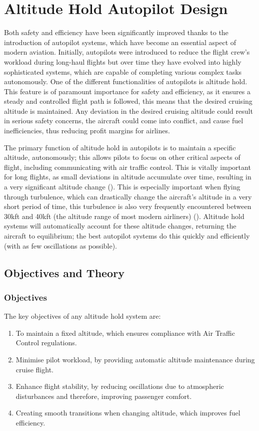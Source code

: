 \documentclass[stu, a4paper, 12pt, floatsintext]{apa7}
\numberwithin{figure}{section}
\numberwithin{table}{section}
\numberwithin{equation}{section}
\begin{document}
\section{Altitude Hold Autopilot Design}
Both safety and efficiency have been significantly improved thanks to the introduction of autopilot systems, which have become an essential aspect of modern aviation. Initially, autopilots were introduced to reduce the flight crew’s workload during long-haul flights but over time they have evolved into highly sophisticated systems, which are capable of completing various complex tasks autonomously. One of the different functionalities of autopilots is altitude hold. This feature is of paramount importance for safety and efficiency, as it ensures a steady and controlled flight path is followed, this means that the desired cruising altitude is maintained. Any deviation in the desired cruising altitude could result in serious safety concerns, the aircraft could come into conflict, and cause fuel inefficiencies, thus reducing profit margins for airlines. \newline

The primary function of altitude hold in autopilots is to maintain a specific altitude, autonomously; this allows pilots to focus on other critical aspects of flight, including communicating with air traffic control. This is vitally important for long flights, as small deviations in altitude accumulate over time, resulting in a very significant altitude change (\cite{nasa2017}). This is especially important when flying through turbulence, which can drastically change the aircraft’s altitude in a very short period of time, this turbulence is also very frequently encountered between 30kft and 40kft (the altitude range of most modern airliners) (\cite{nasa2017}). Altitude hold systems will automatically account for these altitude changes, returning the aircraft to equilibrium; the best autopilot systems do this quickly and efficiently (with as few oscillations as possible).

\newpage

\subsection{Objectives and Theory}

\subsubsection{Objectives}
The key objectives of any altitude hold system are: 
\begin{enumerate}
    \item To maintain a fixed altitude, which ensures compliance with Air Traffic Control regulations.
    \item Minimise pilot workload, by providing automatic altitude maintenance during cruise flight.
    \item Enhance flight stability, by reducing oscillations due to atmospheric disturbances and therefore, improving passenger comfort.
    \item Creating smooth transitions when changing altitude, which improves fuel efficiency. 
\end{enumerate}
\end{document}
